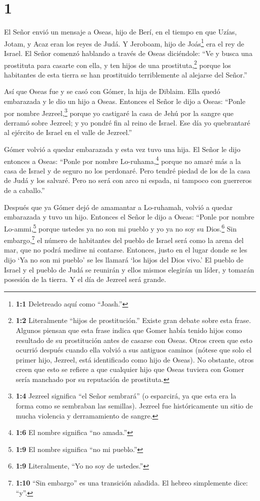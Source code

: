 \hypertarget{section}{%
\section{1}\label{section}}

 El Señor envió un mensaje a Oseas, hijo de Berí, en el
tiempo en que Uzías, Jotam, y Acaz eran los reyes de Judá. Y Jeroboam,
hijo de Joás\footnote{\textbf{1:1} Deletreado aquí como ``Joash.''} era
el rey de Israel.  El Señor comenzó hablando a través de
Oseas diciéndole: ``Ve y busca una prostituta para casarte con ella, y
ten hijos de una prostituta,\footnote{\textbf{1:2} Literalmente ``hijos
  de prostitución.'' Existe gran debate sobre esta frase. Algunos
  piensan que esta frase indica que Gomer había tenido hijos como
  resultado de su prostitución antes de casarse con Oseas. Otros creen
  que esto ocurrió después cuando ella volvió a sus antiguos caminos
  (nótese que solo el primer hijo, Jezreel, está identificado como hijo
  de Oseas). No obstante, otros creen que esto se refiere a que
  cualquier hijo que Oseas tuviera con Gomer sería manchado por su
  reputación de prostituta.} porque los habitantes de esta tierra se han
prostituido terriblemente al alejarse del Señor.''

 Así que Oseas fue y se casó con Gómer, la hija de Diblaim.
Ella quedó embarazada y le dio un hijo a Oseas.  Entonces el
Señor le dijo a Oseas: ``Ponle por nombre Jezreel,\footnote{\textbf{1:4}
  Jezreel significa ``el Señor sembrará'' (o esparcirá, ya que esta era
  la forma como se sembraban las semillas). Jezreel fue históricamente
  un sitio de mucha violencia y derramamiento de sangre.} porque yo
castigaré la casa de Jehú por la sangre que derramó sobre Jezreel; y yo
pondré fin al reino de Israel.  Ese día yo quebrantaré al
ejército de Israel en el valle de Jezreel.''

 Gómer volvió a quedar embarazada y esta vez tuvo una hija.
El Señor le dijo entonces a Oseas: ``Ponle por nombre
Lo-ruhama,\footnote{\textbf{1:6} El nombre significa ``no amada.''}
porque no amaré más a la casa de Israel y de seguro no los perdonaré.
 Pero tendré piedad de los de la casa de Judá y los salvaré.
Pero no será con arco ni espada, ni tampoco con guerreros de a
caballo.''

 Después que ya Gómer dejó de amamantar a Lo-ruhamah, volvió
a quedar embarazada y tuvo un hijo.  Entonces el Señor le
dijo a Oseas: ``Ponle por nombre Lo-ammi,\footnote{\textbf{1:9} El
  nombre significa ``no mi pueblo.''} porque ustedes ya no son mi pueblo
y yo ya no soy su Dios.\footnote{\textbf{1:9} Literalmente, ``Yo no soy
  de ustedes.''}  Sin embargo,\footnote{\textbf{1:10} ``Sin
  embargo'' es una transición añadida. El hebreo simplemente dice:
  ``y''.} el número de habitantes del pueblo de Israel será como la
arena del mar, que no podrá medirse ni contarse. Entonces, justo en el
lugar donde se les dijo `Ya no son mi pueblo' se les llamará `los hijos
del Dios vivo.'  El pueblo de Israel y el pueblo de Judá se
reunirán y ellos mismos elegirán un líder, y tomarán posesión de la
tierra. Y el día de Jezreel será grande.

